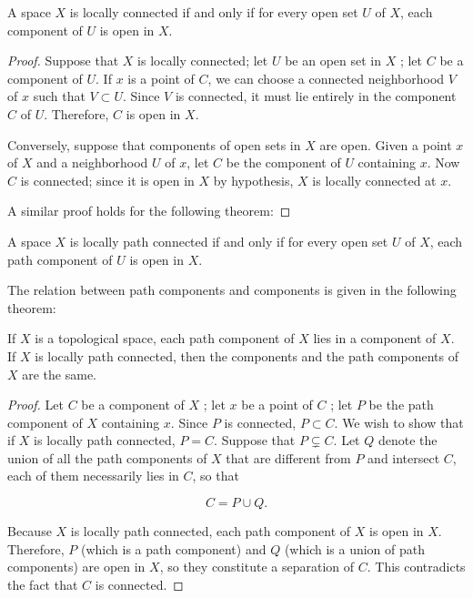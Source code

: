 \begin{theorem}
\label{thm:\thetheorem}
 A space \(X\) is locally connected if and only if for every open set \(U\) of \(X\), each component of \(U\) is open in \(X\).

\end{theorem}
\begin{proof}
Suppose that \(X\) is locally connected; let \(U\) be an open set in \(X\) ; let \(C\) be a component of \(U\). If \(x\) is a point of \(C\), we can choose a connected neighborhood \(V\) of \(x\) such that \(V \subset U\). Since \(V\) is connected, it must lie entirely in the component \(C\) of \(U\). Therefore, \(C\) is open in \(X\).

Conversely, suppose that components of open sets in \(X\) are open. Given a point \(x\) of \(X\) and a neighborhood \(U\) of \(x\), let \(C\) be the component of \(U\) containing \(x\). Now \(C\) is connected; since it is open in \(X\) by hypothesis, \(X\) is locally connected at \(x\).

A similar proof holds for the following theorem:
\end{proof}

\begin{theorem}
\label{thm:\thetheorem}
 A space \(X\) is locally path connected if and only if for every open set \(U\) of \(X\), each path component of \(U\) is open in \(X\).
\end{theorem}

The relation between path components and components is given in the following theorem:

\begin{theorem}
\label{thm:\thetheorem}
 If \(X\) is a topological space, each path component of \(X\) lies in a component of \(X\). If \(X\) is locally path connected, then the components and the path components of \(X\) are the same.
\end{theorem}
\begin{proof}
Let \(C\) be a component of \(X\) ; let \(x\) be a point of \(C\) ; let \(P\) be the path component of \(X\) containing \(x\). Since \(P\) is connected, \(P \subset C\). We wish to show that if \(X\) is locally path connected, \(P = C\). Suppose that \(P \subsetneq C\). Let \(Q\) denote the union of all the path components of \(X\) that are different from \(P\) and intersect \(C\), each of them necessarily lies in \(C\), so that

\[
C = P \cup Q\text{.}
\]

Because \(X\) is locally path connected, each path component of \(X\) is open in \(X\). Therefore, \(P\) (which is a path component) and \(Q\) (which is a union of path components) are open in \(X\), so they constitute a separation of \(C\). This contradicts the fact that \(C\) is connected.
\end{proof}
